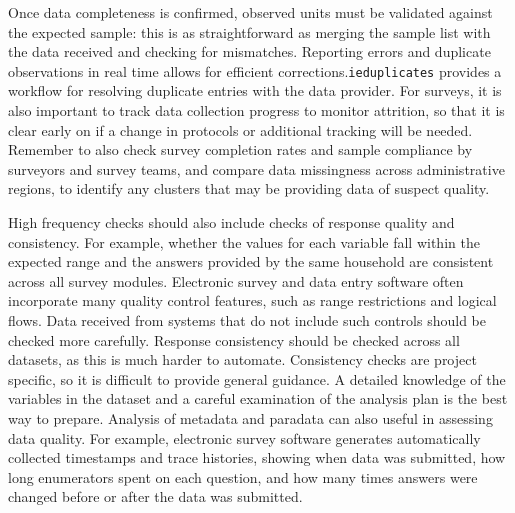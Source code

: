 Once data completeness is confirmed,
observed units must be validated against the expected sample:
this is as straightforward as merging the sample list
with the data received and checking for mismatches.
Reporting errors and duplicate observations in real time allows for efficient corrections.\texttt{ieduplicates}
provides a workflow for resolving duplicate entries with the data provider.
For surveys, it is also important to track data collection progress to  monitor attrition,
so that it is clear early on if a change in protocols or additional tracking will be needed.
Remember to also check survey completion rates
and sample compliance by surveyors and survey teams,
and compare data missingness across administrative regions,
to identify any clusters that may be providing data of suspect quality.

High frequency checks should also include checks of response quality and consistency.
For example, whether the values for each variable fall within the expected range and
the answers provided by the same household are consistent across all survey modules.
Electronic survey and data entry software often incorporate many quality control features,
such as range restrictions and logical flows.
Data received from systems that do not include such controls should be checked more carefully.
Response consistency should be checked across all datasets, as this is much harder to automate.
Consistency checks are project specific, so it is difficult to provide general guidance.
A detailed knowledge of the variables in the dataset and a careful examination of the analysis plan
is the best way to prepare.
Analysis of metadata and paradata can also useful in assessing data quality.
For example, electronic survey software generates
automatically collected timestamps and trace histories,
showing when data was submitted, how long enumerators spent on each question,
and how many times answers were changed before or after the data was submitted.

